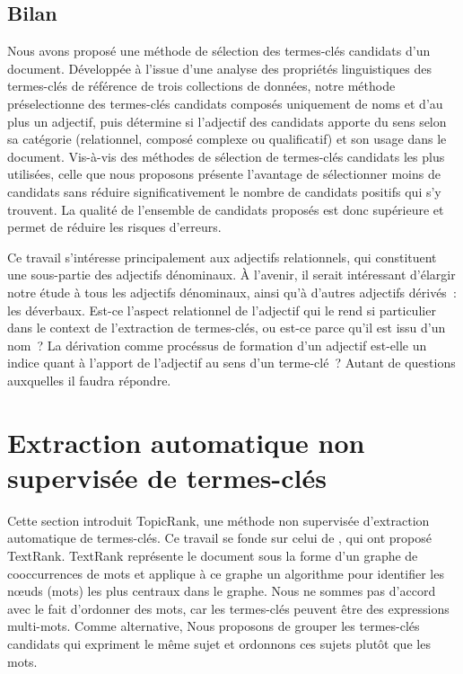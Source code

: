     \subsection{Bilan}
    \label{subsec:main:domain_independent_keyphrase_extraction-keyphrase_candidate_selection-conclusion}
      Nous avons proposé une méthode de sélection des termes-clés candidats d'un
      document. Développée à l'issue d'une analyse des propriétés linguistiques
      des termes-clés de référence de trois collections de données, notre
      méthode préselectionne des termes-clés candidats composés uniquement de
      noms et d'au plus un adjectif, puis détermine si l'adjectif des candidats
      apporte du sens selon sa catégorie (relationnel, composé complexe ou
      qualificatif) et son usage dans le document. Vis-à-vis des méthodes de
      sélection de termes-clés candidats les plus utilisées, celle que nous
      proposons présente l'avantage de sélectionner moins de candidats sans
      réduire significativement le nombre de candidats positifs qui s'y
      trouvent. La qualité de l'ensemble de candidats proposés est donc
      supérieure et permet de réduire les risques d'erreurs.

      Ce travail s'intéresse principalement aux adjectifs relationnels, qui
      constituent une sous-partie des adjectifs dénominaux. À l'avenir, il
      serait intéressant d'élargir notre étude à tous les adjectifs dénominaux,
      ainsi qu'à d'autres adjectifs dérivés~: les déverbaux. Est-ce l'aspect
      relationnel de l'adjectif qui le rend si particulier dans le context de
      l'extraction de termes-clés, ou est-ce parce qu'il est issu d'un nom~? La
      dérivation comme procéssus de formation d'un adjectif est-elle un indice
      quant à l'apport de l'adjectif au sens d'un terme-clé~? Autant de
      questions auxquelles il faudra répondre.


  \section{Extraction automatique non supervisée de termes-clés}
  \label{sec:main:domain_independent_keyphrase_extraction-unsupervised_automatic_keyphrase_extraction}
    Cette section introduit TopicRank, une méthode non supervisée d'extraction
    automatique de termes-clés. Ce travail se fonde sur celui de
    , qui ont proposé TextRank. TextRank
    représente le document sous la forme d'un graphe de cooccurrences de mots et
    applique à ce graphe un algorithme pour identifier les n\oe{}uds (mots) les
    plus centraux dans le graphe. Nous ne sommes pas d'accord avec le fait
    d'ordonner des mots, car les termes-clés peuvent être des expressions
    multi-mots. Comme alternative, Nous proposons de grouper les termes-clés
    candidats qui expriment le même sujet et ordonnons ces sujets plutôt que les
    mots.

